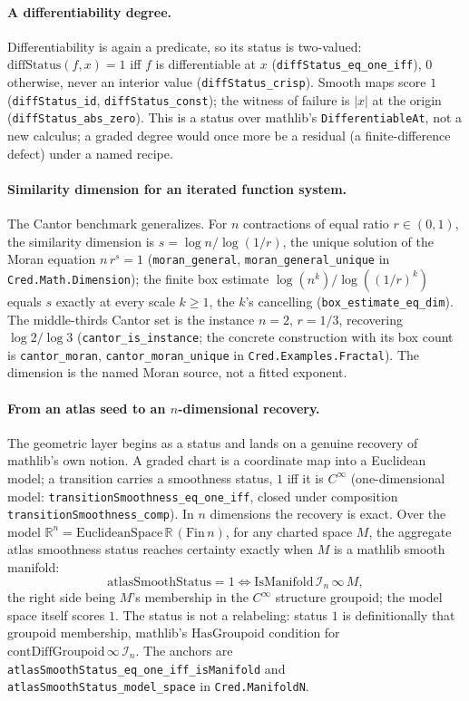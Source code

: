 \documentclass[11pt,a4paper]{article}
\newcommand{\Lean}[1]{\texttt{#1}}
\begin{document}
\paragraph{A differentiability degree.}
Differentiability is again a predicate, so its status is two-valued:
$\mathrm{diffStatus}(f,x)=1$ iff $f$ is differentiable at $x$
(\Lean{diffStatus\_eq\_one\_iff}), $0$ otherwise, never an interior
value (\Lean{diffStatus\_crisp}).  Smooth maps score $1$
(\Lean{diffStatus\_id}, \Lean{diffStatus\_const}); the witness of
failure is $|x|$ at the origin (\Lean{diffStatus\_abs\_zero}).  This is a
status over mathlib's \texttt{DifferentiableAt}, not a new calculus; a
graded degree would once more be a residual (a finite-difference defect)
under a named recipe.

\paragraph{Similarity dimension for an iterated function system.}
The Cantor benchmark generalizes.  For $n$ contractions of equal ratio
$r\in(0,1)$, the similarity dimension is $s=\log n/\log(1/r)$, the unique
solution of the Moran equation $n\,r^{s}=1$
(\Lean{moran\_general}, \Lean{moran\_general\_unique} in
\texttt{Cred.Math.Dimension}); the finite box estimate
$\log(n^{k})/\log((1/r)^{k})$ equals $s$ exactly at every scale $k\ge1$,
the $k$'s cancelling (\Lean{box\_estimate\_eq\_dim}).  The middle-thirds
Cantor set is the instance $n=2$, $r=1/3$, recovering $\log2/\log3$
(\Lean{cantor\_is\_instance}; the concrete construction with its box
count is \Lean{cantor\_moran}, \Lean{cantor\_moran\_unique} in
\texttt{Cred.Examples.Fractal}).  The dimension is the named Moran
source, not a fitted exponent.

\paragraph{From an atlas seed to an $n$-dimensional recovery.}
The geometric layer begins as a status and lands on a genuine recovery
of mathlib's own notion.  A graded chart is a coordinate map into a
Euclidean model; a transition carries a smoothness status, $1$ iff it is
$C^\infty$ (one-dimensional model: \Lean{transitionSmoothness\_eq\_one\_iff},
closed under composition \Lean{transitionSmoothness\_comp}).  In $n$
dimensions the recovery is exact.  Over the model
$\mathbb{R}^n=\mathrm{EuclideanSpace}\,\mathbb{R}\,(\mathrm{Fin}\,n)$, for
any charted space $M$, the aggregate atlas smoothness status reaches
certainty exactly when $M$ is a mathlib smooth manifold:
\[
  \mathrm{atlasSmoothStatus}=1
  \iff \mathrm{IsManifold}\,\mathcal I_n\,\infty\,M,
\]
the right side being $M$'s membership in the $C^\infty$ structure
groupoid; the model space itself scores $1$.  The status is not a
relabeling: status $1$ is definitionally that groupoid membership,
mathlib's $\mathrm{HasGroupoid}$ condition for
$\mathrm{contDiffGroupoid}\,\infty\,\mathcal I_n$.  The anchors are
\texttt{atlasSmoothStatus\_eq\_one\_iff\_isManifold} and
\texttt{atlasSmoothStatus\_model\_space} in \texttt{Cred.ManifoldN}.
\end{document}
